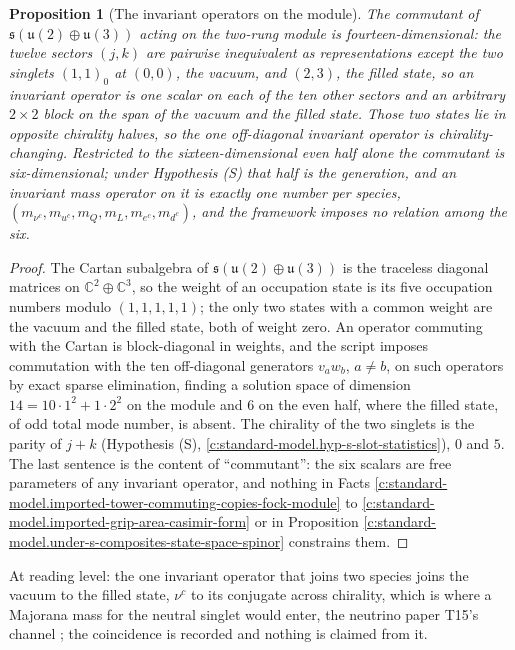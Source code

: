 \documentclass[11pt]{article}
\newtheorem{proposition}[theorem]{Proposition}
\theoremstyle{definition}
\theoremstyle{plain}
\providecommand{\C}{}\renewcommand{\C}{\mathbb{C}}
\providecommand{\uu}{}\renewcommand{\uu}{\mathfrak{u}}
\begin{document}
\begin{proposition}[The invariant operators on the module]\label{c:standard-model.invariant-operators-module}
The commutant of $\mathfrak{s}(\uu(2) \oplus \uu(3))$ acting on the two-rung module is fourteen-dimensional: the twelve sectors $(j,k)$ are pairwise inequivalent as representations except the two singlets $(1,1)_{0}$ at $(0,0)$, the vacuum, and $(2,3)$, the filled state, so an invariant operator is one scalar on each of the ten other sectors and an arbitrary $2 \times 2$ block on the span of the vacuum and the filled state. Those two states lie in opposite chirality halves, so the one off-diagonal invariant operator is chirality-changing. Restricted to the sixteen-dimensional even half alone the commutant is six-dimensional; under Hypothesis (S) that half is the generation, and an invariant mass operator on it is exactly one number per species, $(m_{\nu^{c}}, m_{u^{c}}, m_{Q}, m_{L}, m_{e^{c}}, m_{d^{c}})$, and the framework imposes no relation among the six.
\end{proposition}
\begin{proof}
The Cartan subalgebra of $\mathfrak{s}(\uu(2) \oplus \uu(3))$ is the traceless diagonal matrices on $\C^{2} \oplus \C^{3}$, so the weight of an occupation state is its five occupation numbers modulo $(1,1,1,1,1)$; the only two states with a common weight are the vacuum and the filled state, both of weight zero. An operator commuting with the Cartan is block-diagonal in weights, and the script imposes commutation with the ten off-diagonal generators $v_{a}w_{b}$, $a \ne b$, on such operators by exact sparse elimination, finding a solution space of dimension $14 = 10 \cdot 1^{2} + 1 \cdot 2^{2}$ on the module and $6$ on the even half, where the filled state, of odd total mode number, is absent. The chirality of the two singlets is the parity of $j + k$ (Hypothesis (S), \ref{c:standard-model.hyp-s-slot-statistics}), $0$ and $5$. The last sentence is the content of ``commutant'': the six scalars are free parameters of any invariant operator, and nothing in Facts \ref{c:standard-model.imported-tower-commuting-copies-fock-module} to \ref{c:standard-model.imported-grip-area-casimir-form} or in Proposition \ref{c:standard-model.under-s-composites-state-space-spinor} constrains them.

\end{proof}

\label{c:note.standard-model.setting-what-not-derived-series-3}
At reading level: the one invariant operator that joins two species joins the vacuum to the filled state, $\nu^{c}$ to its conjugate across chirality, which is where a Majorana mass for the neutral singlet would enter, the neutrino paper T15's channel \cite{ButlerT15}; the coincidence is recorded and nothing is claimed from it.
\end{document}
